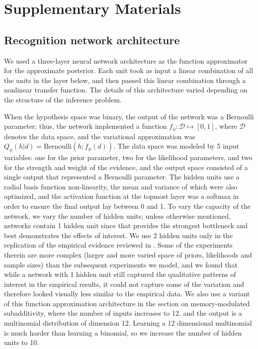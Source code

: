 \chapter{Supplementary Materials}
\label{app}


\section{Recognition network architecture}
\label{app:LTI_arch}

We used a three-layer neural network architecture as the function approximator for the approximate posterior. Each unit took as input a linear combination of all the units in the layer below, and then passed this linear combination through a nonlinear transfer function. The details of this architecture varied depending on the structure of the inference problem. 

When the hypothesis space was binary, the output of the network was a Bernoulli parameter; thus, the network implemented a function $f_\phi: \mathcal{D} \mapsto [0,1]$, where $\mathcal{D}$ denotes the data space, and the variational approximation was $Q_\phi(h|d) = \text{Bernoulli}(h; f_\phi(d))$. The data space was modeled by 5 input variables: one for the prior parameter, two for the likelihood parameters, and two for the strength and weight of the evidence, and the output space consisted of a single output that represented a Bernoulli parameter. The hidden units use a radial basis function non-linearity, the mean and variance of which were also optimized, and the activation function at the topmost layer was a softmax in order to ensure the final output lay between 0 and 1. To vary the capacity of the network, we vary the number of hidden units; unless otherwise mentioned, networks contain 1 hidden unit since that provides the strongest bottleneck and best demonstrates the effects of interest. We use 2 hidden units only in the replication of the empirical evidence reviewed in \citet{benjamin18}. Some of the experiments therein are more complex (larger and more varied space of priors, likelihoods and sample sizes) than the subsequent experiments we model, and we found that while a network with 1 hidden unit still captured the qualitative patterns of interest in the empirical results, it could not capture some of the variation and therefore looked visually less similar to the empirical data. We also use a variant of this function approximation architecture in the section on memory-modulated subadditivity, where the number of inputs increases to 12, and the output is a multinomial distribution of dimension 12. 
Learning a 12 dimensional multinomial is much harder than learning a binomial, so we increase the number of hidden units to 10.

